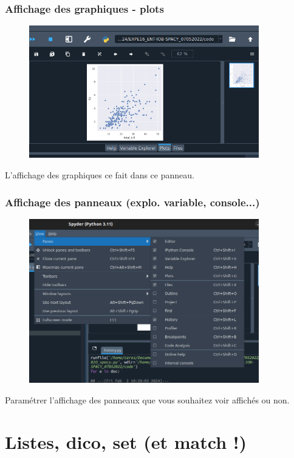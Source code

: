 \begin{frame}
  \frametitle{Affichage des graphiques - plots}
  \begin{figure}
  \includegraphics[width=10cm]{images/spyder_plots.png}
	\end{figure} 
	 L'affichage des graphiques ce fait dans ce panneau.
\end{frame}
  
\begin{frame}
  \frametitle{Affichage des panneaux (explo. variable, console...)}
  \begin{figure}
  \includegraphics[width=10cm]{images/spyder_view.png}
	\end{figure} 
	\vspace{-0.3cm}
	 Paramétrer l'affichage des panneaux que vous souhaitez voir affichés ou non.
\end{frame}
  
\section{Listes, dico, set (et match !)}

